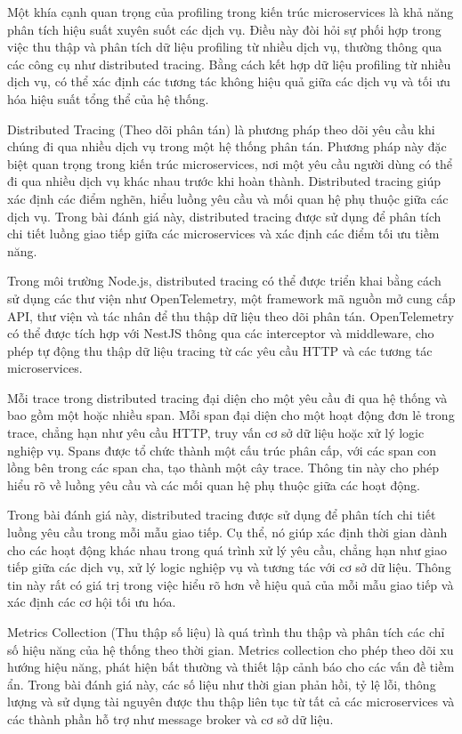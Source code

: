 Một khía cạnh quan trọng của profiling trong kiến trúc microservices là khả năng phân tích hiệu suất xuyên suốt các dịch vụ. Điều này đòi hỏi sự phối hợp trong việc thu thập và phân tích dữ liệu profiling từ nhiều dịch vụ, thường thông qua các công cụ như distributed tracing. Bằng cách kết hợp dữ liệu profiling từ nhiều dịch vụ, có thể xác định các tương tác không hiệu quả giữa các dịch vụ và tối ưu hóa hiệu suất tổng thể của hệ thống.

Distributed Tracing (Theo dõi phân tán) là phương pháp theo dõi yêu cầu khi chúng đi qua nhiều dịch vụ trong một hệ thống phân tán. Phương pháp này đặc biệt quan trọng trong kiến trúc microservices, nơi một yêu cầu người dùng có thể đi qua nhiều dịch vụ khác nhau trước khi hoàn thành. Distributed tracing giúp xác định các điểm nghẽn, hiểu luồng yêu cầu và mối quan hệ phụ thuộc giữa các dịch vụ. Trong bài đánh giá này, distributed tracing được sử dụng để phân tích chi tiết luồng giao tiếp giữa các microservices và xác định các điểm tối ưu tiềm năng.

Trong môi trường Node.js, distributed tracing có thể được triển khai bằng cách sử dụng các thư viện như OpenTelemetry, một framework mã nguồn mở cung cấp API, thư viện và tác nhân để thu thập dữ liệu theo dõi phân tán. OpenTelemetry có thể được tích hợp với NestJS thông qua các interceptor và middleware, cho phép tự động thu thập dữ liệu tracing từ các yêu cầu HTTP và các tương tác microservices.

Mỗi trace trong distributed tracing đại diện cho một yêu cầu đi qua hệ thống và bao gồm một hoặc nhiều span. Mỗi span đại diện cho một hoạt động đơn lẻ trong trace, chẳng hạn như yêu cầu HTTP, truy vấn cơ sở dữ liệu hoặc xử lý logic nghiệp vụ. Spans được tổ chức thành một cấu trúc phân cấp, với các span con lồng bên trong các span cha, tạo thành một cây trace. Thông tin này cho phép hiểu rõ về luồng yêu cầu và các mối quan hệ phụ thuộc giữa các hoạt động.

Trong bài đánh giá này, distributed tracing được sử dụng để phân tích chi tiết luồng yêu cầu trong mỗi mẫu giao tiếp. Cụ thể, nó giúp xác định thời gian dành cho các hoạt động khác nhau trong quá trình xử lý yêu cầu, chẳng hạn như giao tiếp giữa các dịch vụ, xử lý logic nghiệp vụ và tương tác với cơ sở dữ liệu. Thông tin này rất có giá trị trong việc hiểu rõ hơn về hiệu quả của mỗi mẫu giao tiếp và xác định các cơ hội tối ưu hóa.

Metrics Collection (Thu thập số liệu) là quá trình thu thập và phân tích các chỉ số hiệu năng của hệ thống theo thời gian. Metrics collection cho phép theo dõi xu hướng hiệu năng, phát hiện bất thường và thiết lập cảnh báo cho các vấn đề tiềm ẩn. Trong bài đánh giá này, các số liệu như thời gian phản hồi, tỷ lệ lỗi, thông lượng và sử dụng tài nguyên được thu thập liên tục từ tất cả các microservices và các thành phần hỗ trợ như message broker và cơ sở dữ liệu.

